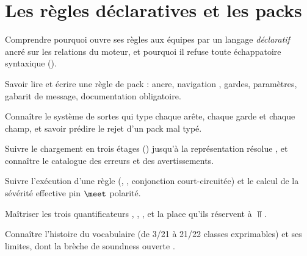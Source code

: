 \chapter{Les règles déclaratives et les packs}
\label{chap:regles-declaratives}

\begin{objectifs}
  \item Comprendre pourquoi \reactant{} ouvre ses règles aux équipes par un langage \emph{déclaratif} ancré sur les relations du moteur, et pourquoi il refuse toute échappatoire syntaxique ().
  \item Savoir lire et écrire une règle de pack : ancre, navigation , gardes, paramètres, gabarit de message, documentation obligatoire.
  \item Connaître le système de sortes qui type chaque arête, chaque garde et chaque champ, et savoir prédire le rejet d'un pack mal typé.
  \item Suivre le chargement en trois étages () jusqu'à la représentation résolue , et connaître le catalogue des erreurs et des avertissements.
  \item Suivre l'exécution d'une règle (, , conjonction court-circuitée) et le calcul de la sévérité effective \og pin $\meet$ polarité\fg{}.
  \item Maîtriser les trois quantificateurs , , , et la place qu'ils réservent à $\Top$.
  \item Connaître l'histoire du vocabulaire (de 3/21 à 21/22 classes exprimables) et ses limites, dont la brèche de soundness ouverte .
\end{objectifs}


